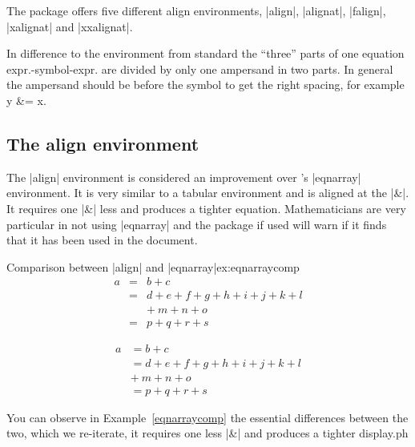 
The  package offers five different align environments, |align|, |alignat|, |falign|, |xalignat| and |xxalignat|. 

In difference to the  environment from standard \latex the ``three'' parts of one equation expr.-symbol-expr. are divided by only one ampersand in two parts. In general the ampersand should be before the symbol to get the right spacing, for example y \&= x. 

\subsection{The align environment}

The |align| environment is considered an improvement over \latex's |eqnarray| environment. It is very similar to a tabular
environment and is aligned at the |&|. 
It requires one |&| less and produces a tighter equation. Mathematicians 
are very particular in not using |eqnarray| and the package 
 if used will warn if it finds that it has been used in the document. 


\begin{texexample}{Comparison between |align| and |eqnarray|}{ex:eqnarraycomp}
\begin{eqnarray}
a & = & b + c \\
  & = & d + e + f + g + h + i
        + j + k + l \nonumber \\
  &   & +\: m + n + o \\
  & = & p + q + r + s
\end{eqnarray}

\begin{align}
a & =  b + c \\
  & =  d + e + f + g + h + i
       + j + k + l \nonumber \\
  & +\: m + n + o \\
  & =  p + q + r + s
\end{align}
\end{texexample}


You can observe in Example~\ref{eqnarraycomp} the essential differences between the two, which we re-iterate, it requires one less |&| and produces a tighter display.ph

